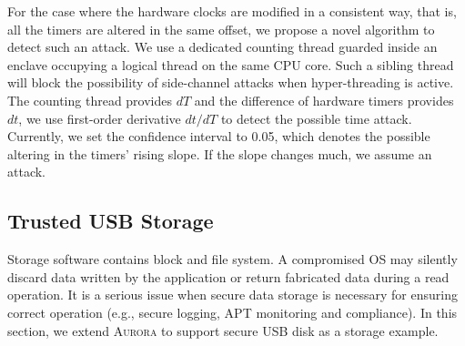 For the case where the hardware clocks are modified in a consistent way, that is, all the timers are altered in the same offset, we propose a novel algorithm to detect such an attack. We use a dedicated counting thread \cite{DBLP:conf/dimva/SchwarzWGMM17} guarded inside an enclave occupying a logical thread on the same CPU core. Such a sibling thread will block the possibility of side-channel attacks when hyper-threading is active. The counting thread provides $dT$ and the difference of hardware timers provides $dt$, we use first-order derivative $dt/dT$ to detect the possible time attack. Currently, we set the confidence interval to 0.05, which denotes the possible altering in the timers' rising slope. If the slope changes much, we assume an attack.


\subsection{Trusted USB Storage}\label{storage_service}
Storage software contains block and file system. A compromised OS may silently discard data written by the application or return fabricated data during a read operation. It is a serious issue when secure data storage is  necessary for ensuring correct operation (e.g., secure logging, APT monitoring and compliance). In this section, we extend \textsc{Aurora} to support secure USB disk as a storage example.

